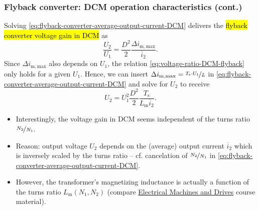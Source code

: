\begin{frame}
    \frametitle{Flyback converter: DCM operation characteristics (cont.)}
    Solving \eqref{eq:flyback-converter-average-output-current-DCM} delivers the \hl{flyback converter voltage gain in DCM} as
    \begin{equation}
        \frac{U_2}{U_1} = \frac{D^2}{2} \frac{\Delta i_\mathrm{m,max}}{\overline{i}_2}.
        \label{eq:voltage-ratio-DCM-flyback}
    \end{equation}
    \pause%
    Since $\Delta i_\mathrm{m,max}$ also depends on $U_1$, the relation \eqref{eq:voltage-ratio-DCM-flyback} only holds for a given $U_1$. Hence, we can insert $\Delta i_\mathrm{m,max}=\nicefrac{T_\mathrm{s} \cdot U_1}{L}$ in \eqref{eq:flyback-converter-average-output-current-DCM} and solve for $U_2$ to receive
    \begin{equation}
        U_2= U_1^2 \frac{D^2}{2} \frac{T_\mathrm{s}}{L_\mathrm{m} \overline{i}_2}.
    \end{equation}
    \pause%
    \begin{itemize}
        \item Interestingly, the voltage gain in DCM seems independent of the turns ratio $\nicefrac{N_2}{N_1}$.
        \item Reason: output voltage $U_2$ depends on the (average) output current $\overline{i}_2$ which is inversely scaled by the turns ratio -- cf. cancelation of $\nicefrac{N_2}{N_1}$ in \eqref{eq:flyback-converter-average-output-current-DCM}.
        \item However, the transformer's magnetizing inductance is actually a function of the turns ratio $L_\mathrm{m}(N_1, N_2)$ (compare \href{https://github.com/IAS-Uni-Siegen/EMD_course}{Electrical Machines and Drives} course material). 
    \end{itemize}
\end{frame}

